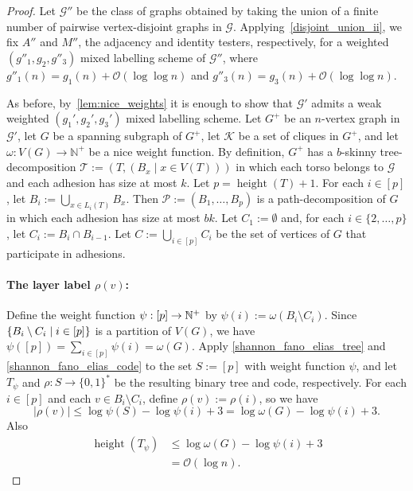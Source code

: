 \documentclass{patmorin}
\renewcommand{\leq}{\leqslant}
\newcommand{\gwen}[1]{\textcolor{Purple}{GJ: #1}}
\DeclareMathOperator{\height}{height}
\newcommand{\NN}{\mathbb{N}}
\newcommand{\Oh}{\mathcal{O}}
\DeclarePairedDelimiter{\set}{\{}{\}}
\begin{document}
  \begin{proof}

    Let $\mathcal{G''}$ be the class of graphs obtained by taking the union of a finite number of pairwise vertex-disjoint graphs in $\mathcal{G}$.
    Applying~\cref{disjoint_union_ii}, we fix $A''$ and $M''$, the adjacency and identity testers, respectively, for a weighted $(g''_1,g_2,g''_3)$ mixed labelling scheme of $\mathcal{G''}$, where $g''_1(n) = g_1(n) + \Oh(\log\log n)$ and $g''_3(n) = g_3(n) + \Oh(\log\log n)$.

     As before,  by~\cref{lem:nice_weights} it is enough to show that $\mathcal{G}'$ admits a weak weighted $(g_1',g_2',g_3')$ mixed labelling scheme.
    Let $G^+$ be an $n$-vertex graph in $\mathcal{G}'$, let $G$ be a spanning subgraph of $G^+$, let $\mathcal{K}$ be a set of cliques in $G^+$, and let $\omega:V(G)\to\NN^+$ be a nice weight function.
    By definition, $G^+$ has a $b$-skinny tree-decomposition $\mathcal{T}:=(T,(B_x\mid x\in V(T)))$ in which each torso belongs to $\mathcal{G}$ and each adhesion has size at most $k$.
    Let $p=\height(T)+1$.
    For each $i\in[p]$, let $B_i:=\bigcup_{x\in L_i(T)} B_x$.  Then $\mathcal{P}:=(B_1,\ldots,B_p)$ is a path-decomposition of $G$ in which each adhesion has size at most $bk$.
    Let $C_1:=\emptyset$ and, for each $i\in\{2,\ldots,p\}$, let $C_i:=B_i\cap B_{i-1}$.
    Let $C:=\bigcup_{i\in[p]} C_i$  be the set of vertices of $G$ that participate in adhesions.


    \paragraph{\boldmath The layer label $\rho(v)$:}
    Define the weight function $\psi:[p]\to\mathbb{N}^+$ by $\psi(i):=\omega(B_i\setminus C_i)$.
    Since $\set{B_i\setminus C_i\mid i\in[p]}$ is a partition of $V(G)$, we have  $\psi([p])=\sum_{i\in[p]}\psi(i)=\omega(G)$.
    Apply \cref{shannon_fano_elias_tree} and \cref{shannon_fano_elias_code} to the set $S:=[p]$ with weight function $\psi$, and let $T_\psi$ and $\rho:S\to\{0,1\}^*$ be the resulting binary tree and code, respectively.
    For each $i\in[p]$ and each $v\in B_i\setminus C_i$, define $\rho(v):=\rho(i)$, so we have
    \begin{equation}
    \label{eq:rho}
    |\rho(v)| \leq \log\psi(S)-\log\psi(i)+3=\log\omega(G)-\log\psi(i)+3.
    \end{equation}
    Also
    \begin{equation}
    \label{eq:height-T-psi}
    \begin{split}
    \height(T_{\psi})
    &\leq \log\omega(G)-\log\psi(i)+3\\
    &=\Oh(\log n).
    \end{split}
    \end{equation}


\end{proof}
\end{document}
